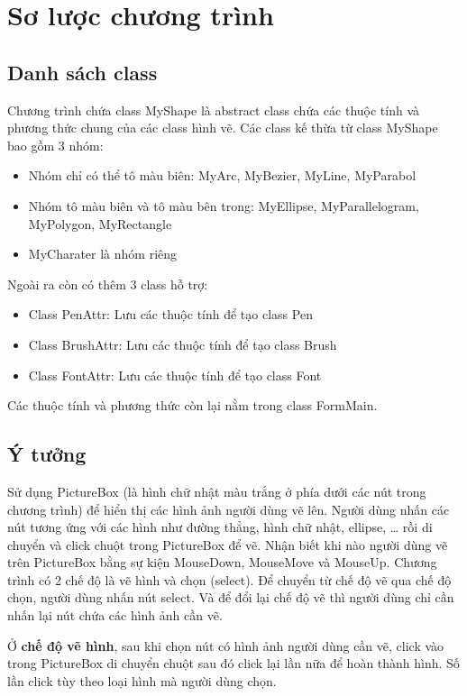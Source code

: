 \documentclass[12pt]{article}
\begin{document}
\section{Sơ lược chương trình}
\subsection{Danh sách class}
Chương trình chứa class MyShape là abstract class chứa các thuộc tính và phương thức chung của các class hình vẽ.
Các class kế thừa từ class MyShape bao gồm 3 nhóm:
\begin{itemize}
\item Nhóm chỉ có thể tô màu biên: MyArc, MyBezier, MyLine, MyParabol
\item Nhóm tô màu biên và tô màu bên trong: MyEllipse, MyParallelogram, MyPolygon, MyRectangle
\item MyCharater là nhóm riêng
\end{itemize}

Ngoài ra còn có thêm 3 class hỗ trợ:
\begin{itemize}
\item Class PenAttr: Lưu các thuộc tính để tạo class Pen
\item Class BrushAttr: Lưu các thuộc tính để tạo class Brush
\item Class FontAttr: Lưu các thuộc tính để tạo class Font
\end{itemize}

Các thuộc tính và phương thức còn lại nằm trong class FormMain.

\subsection{Ý tưởng}
Sử dụng PictureBox (là hình chữ nhật màu trắng ở phía dưới các nút trong chương trình) để hiển thị các hình ảnh người dùng vẽ lên.
Người dùng nhấn các nút tương ứng với các hình như đường thẳng, hình chữ nhật, ellipse, … rồi di chuyển và click chuột trong PictureBox để vẽ.
Nhận biết khi nào người dùng vẽ trên PictureBox bằng sự kiện MouseDown, MouseMove và MouseUp.
Chương trình có 2 chế độ là vẽ hình và chọn (select).
Để chuyển từ chế độ vẽ qua chế độ chọn, người dùng nhấn nút select.
Và để đổi lại chế độ vẽ thì người dùng chỉ cần nhấn lại nút chứa các hình ảnh cần vẽ.

Ở \textbf{chế độ vẽ hình}, sau khi chọn nút có hình ảnh người dùng cần vẽ,
click vào trong PictureBox di chuyển chuột sau đó click lại lần nữa để hoàn thành hình.
Số lần click tùy theo loại hình mà người dùng chọn.
\end{document}
